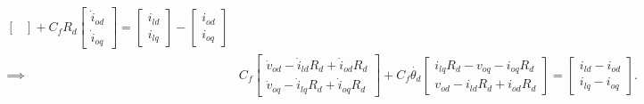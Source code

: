 \begin{align*}
\begin{bmatrix}
	\end{bmatrix}+C_fR_d\begin{bmatrix}
	\dot{i}_{od}\\ \dot{i}_{oq}
	\end{bmatrix} = \begin{bmatrix}
	i_{ld}\\i_{lq}
	\end{bmatrix}-\begin{bmatrix}
	i_{od}\\i_{oq}
	\end{bmatrix}\\
	\implies & C_f\begin{bmatrix}
		\dot{v}_{od}-\dot{i}_{ld}R_d+\dot{i}_{od}R_d\\
		\dot{v}_{oq}-\dot{i}_{lq}R_d+\dot{i}_{oq}R_d
	\end{bmatrix}+C_f\dot{\theta_d}\begin{bmatrix}
		i_{lq}R_d-v_{oq}-i_{oq}R_d\\
		v_{od}-i_{ld}R_d+i_{od}R_d
	\end{bmatrix} = \begin{bmatrix}
		i_{ld}-i_{od}\\i_{lq}-i_{oq}
	\end{bmatrix}.
\end{align*}
